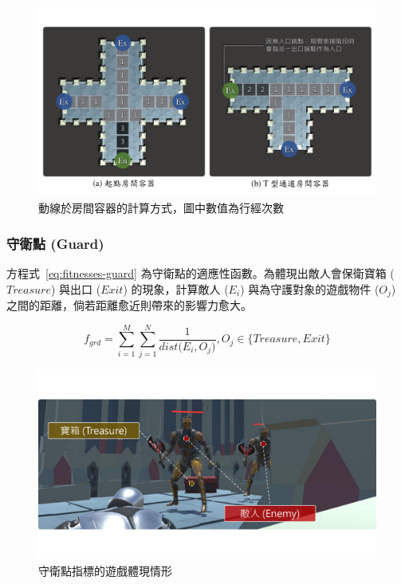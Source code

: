 \begin{figure}[!htb]
  \begin{center}
    \includegraphics[width=1.0\textwidth]{figures/fitnesses-mainpath.pdf}
    \caption{動線於房間容器的計算方式，圖中數值為行經次數}
    \label{fig:fitnesses-mainpath}
  \end{center}
\end{figure}

\subsubsection{守衛點 (Guard)}
\label{sssec:method-segments-fitnesses-guard}

方程式~\ref{eq:fitnesses-guard} 為守衛點的適應性函數。為體現出敵人會保衛寶箱 ($Treasure$) 與出口 ($Exit$) 的現象，計算敵人 ($E_{i}$) 與為守護對象的遊戲物件 ($O_{j}$) 之間的距離，倘若距離愈近則帶來的影響力愈大。

\begin{equation}
    \label{eq:fitnesses-guard}
    f_{grd} = \sum_{i=1}^{M} \sum_{j=1}^{N} \frac{1}{dist\big(E_{i}, O_{j}\big)}, O_{j} \in \{ Treasure, Exit \}
\end{equation}

\begin{figure}[!htb]
  \begin{center}
    \includegraphics[width=1.0\textwidth]{figures/fitnesses-guard-gameplay.pdf}
    \caption{守衛點指標的遊戲體現情形}
    \label{fig:fitnesses-guard-gameplay}
  \end{center}
\end{figure}

